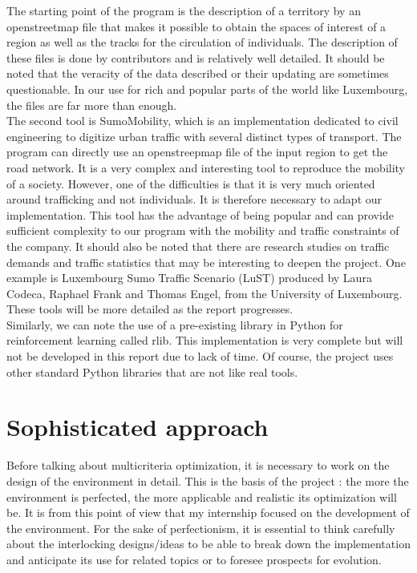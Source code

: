 The starting point of the program is the description of a territory by an openstreetmap file that makes it possible to obtain the spaces of interest of a region as well as the tracks for the circulation of individuals. The description of these files is done by contributors and is relatively well detailed. It should be noted that the veracity of the data described or their updating are sometimes questionable. In our use for rich and popular parts of the world like Luxembourg, the files are far more than enough.\\

The second tool is SumoMobility, which is an implementation dedicated to civil engineering to digitize urban traffic with several distinct types of transport. The program can directly use an openstreepmap file of the input region to get the road network. It is a very complex and interesting tool to reproduce the mobility of a society. However, one of the difficulties is that it is very much oriented around trafficking and not individuals. It is therefore necessary to adapt our implementation. This tool has the advantage of being popular and can provide sufficient complexity to our program with the mobility and traffic constraints of the company. It should also be noted that there are research studies on traffic demands and traffic statistics that may be interesting to deepen the project. One example is Luxembourg Sumo Traffic Scenario (LuST) produced by Laura Codeca, Raphael Frank and Thomas Engel, from the University of Luxembourg.\\

These tools will be more detailed as the report progresses.\\

Similarly, we can note the use of a pre-existing library in Python for reinforcement learning called rlib. This implementation is very complete but will not be developed in this report due to lack of time. Of course, the project uses other standard Python libraries that are not like real tools.\\

\newpage

\section*{Sophisticated approach}

Before talking about multicriteria optimization, it is necessary to work on the design of the environment in detail. This is the basis of the project : the more the environment is perfected, the more applicable and realistic its optimization will be. It is from this point of view that my internship focused on the development of the environment. For the sake of perfectionism, it is essential to think carefully about the interlocking designs/ideas to be able to break down the implementation and anticipate its use for related topics or to foresee prospects for evolution.\\


